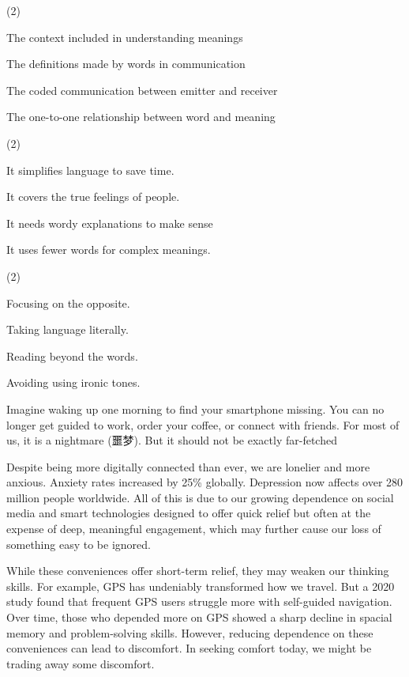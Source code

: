 \documentclass{英语试卷}
\begin{document}
\begin{choices}(2)
  \item The context included in understanding meanings
  \item The definitions made by words in communication
  \item The coded communication between emitter and receiver
  \item The one-to-one relationship between word and meaning
\end{choices}
\begin{choices}(2)
  \item It simplifies language to save time.
  \item It covers the true feelings of people.
  \item It needs wordy explanations to make sense
  \item It uses fewer words for complex meanings.
\end{choices}
\begin{choices}(2)
  \item Focusing on the opposite.
  \item Taking language literally.
  \item Reading beyond the words.
  \item Avoiding using ironic tones.
\end{choices}
\par Imagine waking up one morning to find your smartphone missing. You can no longer get guided to work, order your coffee, or connect with friends. For most of us, it is a nightmare (噩梦). But it should not be exactly far-fetched\par
\par Despite being more digitally connected than ever, we are lonelier and more anxious. Anxiety rates increased by 25\% globally. Depression now affects over 280 million people worldwide. All of this is due to our growing dependence on social media and smart technologies designed to offer quick relief but often at the expense of deep, meaningful engagement, which may further cause our loss of something easy to be ignored.\par
\par While these conveniences offer short-term relief, they may weaken our thinking skills. For example, GPS has undeniably transformed how we travel. But a 2020 study found that frequent GPS users struggle more with self-guided navigation. Over time, those who depended more on GPS showed a sharp decline in spacial memory and problem-solving skills. However, reducing dependence on these conveniences can lead to discomfort. In seeking comfort today, we might be trading away some discomfort.\par
\end{document}
